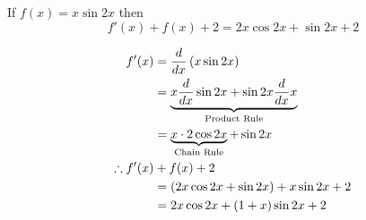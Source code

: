 \documentclass[14pt,fleqn]{extarticle}
\begin{document}
 
\begin{snippet}
    
    \incorrect
    
    If $f(x) = x\sin 2x$ then 
    \[ f'(x) + f(x) + 2 = 2x \cos 2x + \sin 2x + 2 \]
    \reason
    
    \begin{align}
	f'(x) &= \frac{d}{dx} \left(x\sin 2x \right) \\
	&= \underbrace{x\frac{d}{dx} \sin 2x + \sin 2x\frac{d}{dx} x}_{\text{Product Rule}} \\
	&= \underbrace{x\cdot 2\cos 2x}_{\text{Chain Rule}} + \sin 2x \\
	\therefore f'(x) &+ f(x) + 2  \\
	&= \left( 2x\cos 2x + \sin 2x\right) + x\sin 2x + 2 \\
	&= 2x\cos 2x + \left(1+x \right)\sin 2x + 2 
\end{align}
\end{snippet} 
\end{document}
